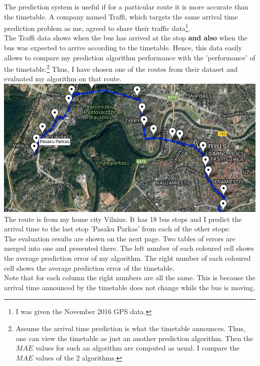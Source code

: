 \documentclass[12pt,a4paper,oneside,openright]{report}
\begin{document}
The prediction system is useful if for a particular route it is more accurate than
the timetable. A company named Traffi, which targets the same arrival time prediction
problem as me, agreed to share their traffic
data\footnote{I was given the November 2016 GPS data.}. \\

The Traffi data shows when the
bus has arrived at the stop \textbf{and also} when the bus was expected to arrive
according to the timetable. Hence, this data easily allows to compare my prediction
algorithm performance with the 'performance' of the timetable.\footnote{Assume the
arrival time prediction is what the timetable announces. Thus, one can view the
timetable as just an another prediction algorithm. Then the $MAE$ values for such an
algorithm are computed as usual. I compare the $MAE$ values of the 2 algorithms.}
Thus, I have chosen one of the routes from their dataset and evaluated my algorithm
on that route. \\

\includegraphics[width=\textwidth]{figs/vilnius_route.png} \\

The route is from my home city Vilnius. It has 18 bus stops and
I predict the arrival time to the last stop 'Pasaku Parkas' from each
of the other stops: \\


The evaluation results are shown on the next page. Two tables of errors are merged
into one and presented there. The left number of each coloured cell shows the
average prediction error of my algorithm. The right number of each coloured cell
shows the average prediction error of the timetable. \\


Note that for each column the right numbers are all the same. This is because the
arrival time announced by the timetable does not change while the bus is moving. \\
\end{document}
